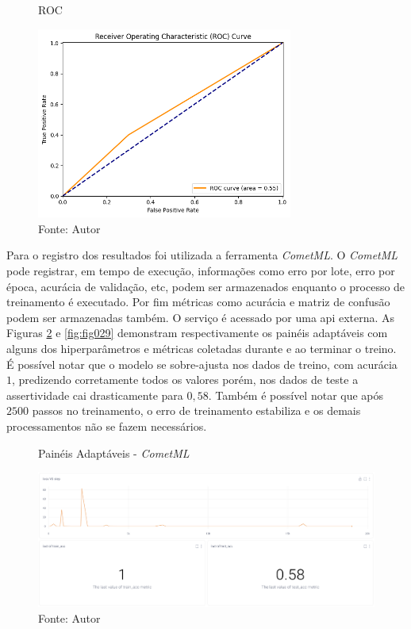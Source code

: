 \begin{figure}[h!]
    \centering
    \caption{ROC}
    \includegraphics[width=0.75\textwidth]{figures/fig017.png}
    \caption*{Fonte: Autor}
    \label{fig:fig017}
\end{figure}


Para o registro dos resultados foi utilizada a ferramenta \textit{CometML}. O \textit{CometML} pode registrar, em tempo de execução, informações como erro por lote, erro por época, acurácia de validação, etc, podem ser armazenados enquanto o processo de treinamento é executado. Por fim métricas como acurácia e matriz de confusão podem ser armazenadas também. O serviço é acessado  por uma \gls{api} externa. As Figuras \ref{fig:fig028} e \ref{fig:fig029} demonstram respectivamente os painéis adaptáveis com alguns dos hiperparâmetros e métricas coletadas durante e ao terminar o treino. É possível notar que o modelo se sobre-ajusta nos dados de treino, com acurácia $1$, predizendo corretamente todos os valores porém, nos dados de teste a assertividade cai drasticamente para $0,58$. Também é possível notar que após $2500$ passos no treinamento, o erro de treinamento estabiliza e os demais processamentos não se fazem necessários.

\begin{figure}[h!]
    \centering
    \caption{Painéis Adaptáveis - \textit{CometML}}
    \includegraphics[width=1\textwidth]{figures/fig028.png}
    \caption*{Fonte: Autor}
    \label{fig:fig028}
\end{figure}


